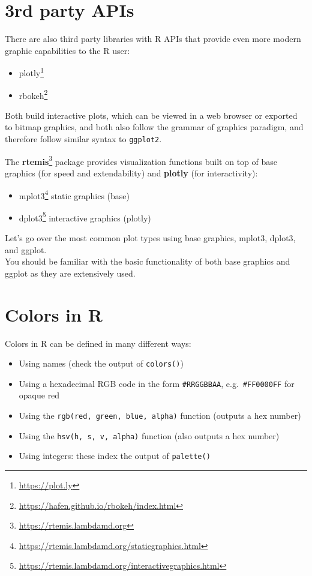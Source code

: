 \documentclass[
]{book}
\providecommand{\tightlist}{%
  \setlength{\itemsep}{0pt}\setlength{\parskip}{0pt}}
\renewcommand{\href}[2]{#2\footnote{\url{#1}}}
\begin{document}
\hypertarget{rd-party-apis}{%
\section{3rd party APIs}\label{rd-party-apis}}

There are also third party libraries with R APIs that provide even more modern graphic capabilities to the R user:

\begin{itemize}
\tightlist
\item
  \href{https://plot.ly}{plotly} \citep{sievert2017plotly}
\item
  \href{https://hafen.github.io/rbokeh/index.html}{rbokeh}
\end{itemize}

Both build interactive plots, which can be viewed in a web browser or exported to bitmap graphics, and both also follow the grammar of graphics paradigm, and therefore follow similar syntax to \texttt{ggplot2}.

The \href{https://rtemis.lambdamd.org}{\textbf{rtemis}} package \citep{gennatas2017towards} provides visualization functions built on top of base graphics (for speed and extendability) and \textbf{plotly} (for interactivity):

\begin{itemize}
\tightlist
\item
  \href{https://rtemis.lambdamd.org/staticgraphics.html}{mplot3} static graphics (base)
\item
  \href{https://rtemis.lambdamd.org/interactivegraphics.html}{dplot3} interactive graphics (plotly)
\end{itemize}

Let's go over the most common plot types using base graphics, mplot3, dplot3, and ggplot.\\
You should be familiar with the basic functionality of both base graphics and ggplot as they are extensively used.

\hypertarget{colors-in-r}{%
\section{Colors in R}\label{colors-in-r}}

Colors in R can be defined in many different ways:

\begin{itemize}
\tightlist
\item
  Using names (check the output of \texttt{colors()})
\item
  Using a hexadecimal RGB code in the form \texttt{\#RRGGBBAA}, e.g.~\texttt{\#FF0000FF} for opaque red
\item
  Using the \texttt{rgb(red,\ green,\ blue,\ alpha)} function (outputs a hex number)
\item
  Using the \texttt{hsv(h,\ s,\ v,\ alpha)} function (also outputs a hex number)
\item
  Using integers: these index the output of \texttt{palette()}
\end{itemize}
\end{document}
